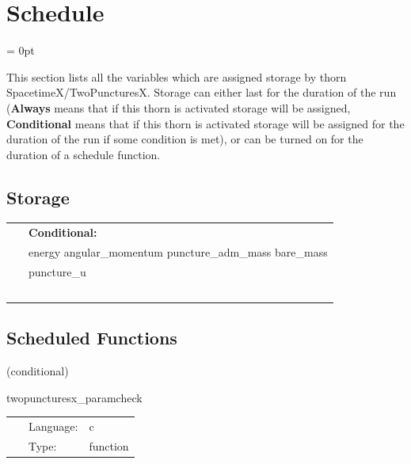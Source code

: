 
\section{Schedule} 


\parskip = 0pt


\noindent This section lists all the variables which are assigned storage by thorn SpacetimeX/TwoPuncturesX.  Storage can either last for the duration of the run ({\bf Always} means that if this thorn is activated storage will be assigned, {\bf Conditional} means that if this thorn is activated storage will be assigned for the duration of the run if some condition is met), or can be turned on for the duration of a schedule function.


\subsection*{Storage}

\hspace{5mm}

 \begin{tabular*}{160mm}{ll} 
~& {\bf Conditional:} \\ 
~ &  energy angular\_momentum puncture\_adm\_mass bare\_mass\\ 
~ &  puncture\_u\\ 
~ & ~\\ 
\end{tabular*} 


\subsection*{Scheduled Functions}
\vspace{5mm}

   (conditional) 

\hspace{5mm} twopuncturesx\_paramcheck 

\hspace{5mm}{\it check parameters and thorn needs } 


\hspace{5mm}

 \begin{tabular*}{160mm}{cll} 
~ & Language:  & c \\ 
~ & Type:  & function \\ 
\end{tabular*} 


\vspace{5mm}

